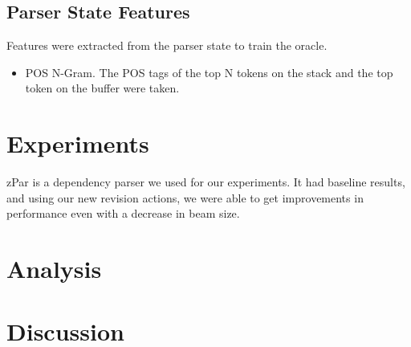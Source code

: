 \documentclass[11pt]{article}
\begin{document}
\subsection{Parser State Features}
Features were extracted from the parser state to train the oracle. 

\begin{itemize}

\item POS N-Gram. The POS tags of the top N tokens on the stack and the top token on the buffer were taken.



\end{itemize}




\section{Experiments}

zPar is a dependency parser we used for our experiments. It had baseline results, and using our new revision actions, we were able to get improvements in performance even with a decrease in beam size.


\section{Analysis}


\section{Discussion}







\newpage
\end{document}
